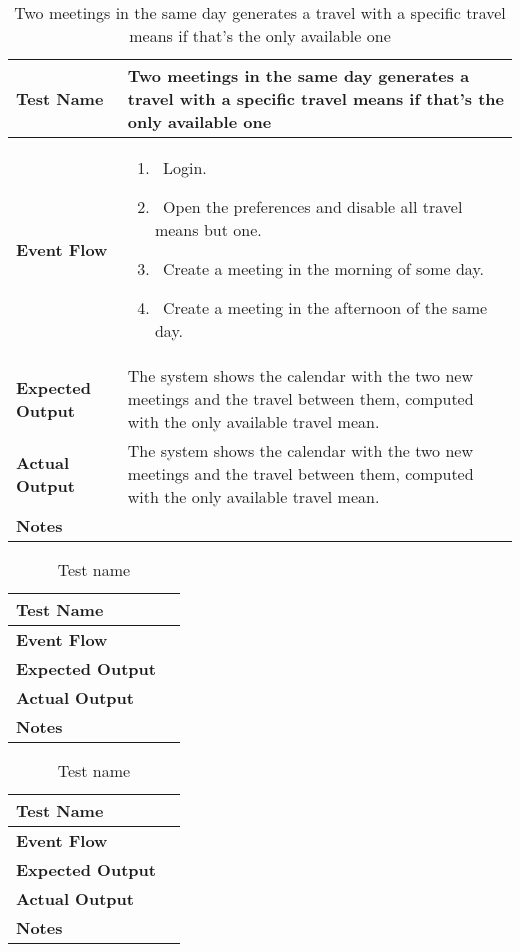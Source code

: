 \begin{table}[h]	
\centering
\def\arraystretch{1.5}
\begin{tabular}{|m{7cm}|m{7cm}|}
	\hline
	\textbf{Test Name}            &  Two meetings in the same day generates a travel with a specific travel means if that's the only available one  \\ \hline
	\textbf{Event Flow}             &   
		\begin{enumerate}
			\item~Login.
			\item~Open the preferences and disable all travel means but one.
			\item~Create a meeting in the morning of some day.
			\item~Create a meeting in the afternoon of the same day.
		\end{enumerate}
	\\ \hline
	\textbf{Expected Output}  &   The system shows the calendar with the two new meetings and the travel between them, computed with the only available travel mean.  \\ \hline
	\textbf{Actual Output}       &  The system shows the calendar with the two new meetings and the travel between them, computed with the only available travel mean.   \\ \hline
	\textbf{Notes} & \\ \hline
\end{tabular}
\caption{Two meetings in the same day generates a travel with a specific travel means if that's the only available one}
\end{table}


\begin{table}[h]	
\centering
\def\arraystretch{1.5}
\begin{tabular}{|m{7cm}|m{7cm}|}
	\hline
	\textbf{Test Name}            &    \\ \hline
	\textbf{Event Flow}             &   \\ \hline
	\textbf{Expected Output}  &     \\ \hline
	\textbf{Actual Output}       &     \\ \hline
	\textbf{Notes} & \\ \hline
\end{tabular}
\caption{Test name}
\end{table}


\begin{table}[h]	
\centering
\def\arraystretch{1.5}
\begin{tabular}{|m{7cm}|m{7cm}|}
	\hline
	\textbf{Test Name}            &    \\ \hline
	\textbf{Event Flow}             &   \\ \hline
	\textbf{Expected Output}  &     \\ \hline
	\textbf{Actual Output}       &     \\ \hline
	\textbf{Notes} & \\ \hline
\end{tabular}
\caption{Test name}
\end{table}
